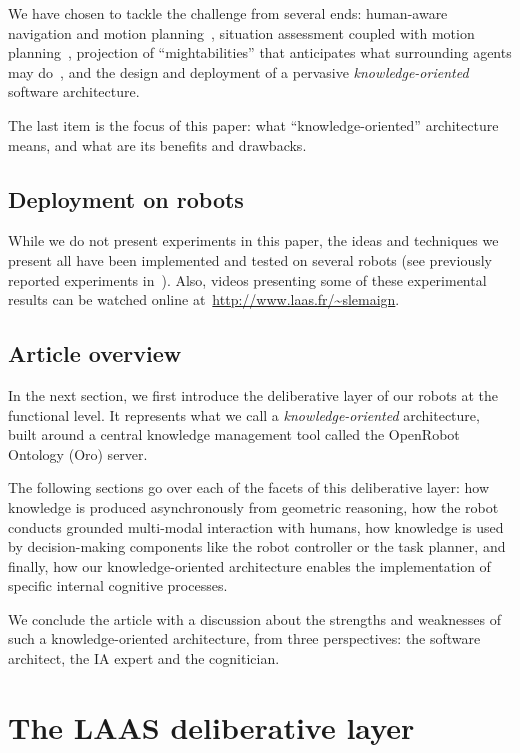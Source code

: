 \documentclass[letterpaper, 10 pt, conference]{ieeeconf}  %
\begin{document}
We have chosen to tackle the challenge from several ends: human-aware
navigation and motion planning~\cite{Mainprice2011}, situation assessment
coupled with motion planning~\cite{Mainprice2012}, projection of
``mightabilities'' that anticipates what surrounding agents may
do~\cite{Pandey2011}, and the design and deployment of a pervasive
\emph{knowledge-oriented} software architecture.

The last item is the focus of this paper: what ``knowledge-oriented''
architecture means, and what are its benefits and drawbacks.

\subsection{Deployment on robots}

While we do not present experiments in this paper, the ideas and techniques we
present all have been implemented and tested on several robots (see previously
reported experiments in~\cite{Lemaignan2010, Ros2010b, Lemaignan2011a,
Warnier2012a}). Also, videos presenting some of these experimental results can
be watched online at~\url{http://www.laas.fr/~slemaign}.

\subsection{Article overview}

In the next section, we first introduce the deliberative layer of our robots at
the functional level. It represents what we call a \emph{knowledge-oriented}
architecture, built around a central knowledge management tool called the
OpenRobot Ontology ({\sc Oro}) server.

The following sections go over each of the facets of this deliberative layer:
how knowledge is produced asynchronously from geometric reasoning, how the
robot conducts grounded multi-modal interaction with humans, how knowledge is
used by decision-making components like the robot controller or the task
planner, and finally, how our knowledge-oriented architecture enables the
implementation of specific internal cognitive processes.

We conclude the article with a discussion about the strengths and weaknesses of
such a knowledge-oriented architecture, from three perspectives: the software
architect, the IA expert and the cognitician.


\section{The LAAS deliberative layer}
\end{document}
